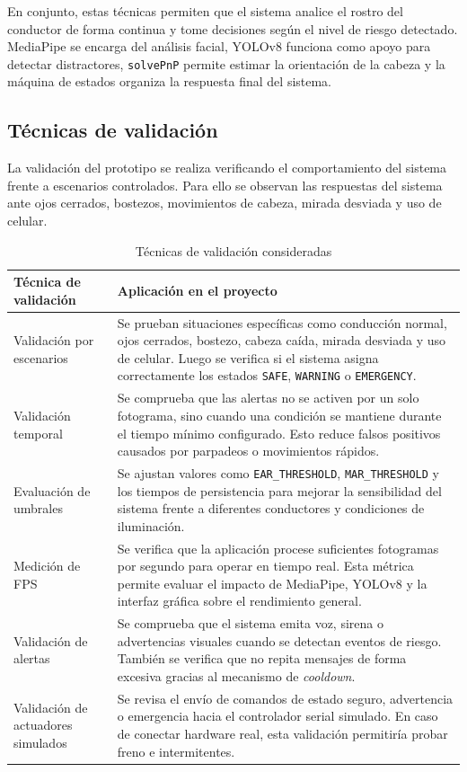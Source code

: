\documentclass[conference]{IEEEtran}
\begin{document}
En conjunto, estas técnicas permiten que el sistema analice el rostro del conductor de forma continua y tome decisiones según el nivel de riesgo detectado. MediaPipe se encarga del análisis facial, YOLOv8 funciona como apoyo para detectar distractores, \texttt{solvePnP} permite estimar la orientación de la cabeza y la máquina de estados organiza la respuesta final del sistema.



\subsection{Técnicas de validación}

La validación del prototipo se realiza verificando el comportamiento del sistema frente a escenarios controlados. Para ello se observan las respuestas del sistema ante ojos cerrados, bostezos, movimientos de cabeza, mirada desviada y uso de celular.

\begin{table}[H]
\centering
\caption{Técnicas de validación consideradas}
\label{tab:tecnicas_validacion}
\begin{tabularx}{\columnwidth}{|>{\raggedright\arraybackslash}p{2.9cm}|>{\raggedright\arraybackslash}X|}
\hline
\textbf{Técnica de validación} & \textbf{Aplicación en el proyecto} \\
\hline
Validación por escenarios & Se prueban situaciones específicas como conducción normal, ojos cerrados, bostezo, cabeza caída, mirada desviada y uso de celular. Luego se verifica si el sistema asigna correctamente los estados \texttt{SAFE}, \texttt{WARNING} o \texttt{EMERGENCY}. \\
\hline
Validación temporal & Se comprueba que las alertas no se activen por un solo fotograma, sino cuando una condición se mantiene durante el tiempo mínimo configurado. Esto reduce falsos positivos causados por parpadeos o movimientos rápidos. \\
\hline
Evaluación de umbrales & Se ajustan valores como \texttt{EAR\_THRESHOLD}, \texttt{MAR\_THRESHOLD} y los tiempos de persistencia para mejorar la sensibilidad del sistema frente a diferentes conductores y condiciones de iluminación. \\
\hline
Medición de FPS & Se verifica que la aplicación procese suficientes fotogramas por segundo para operar en tiempo real. Esta métrica permite evaluar el impacto de MediaPipe, YOLOv8 y la interfaz gráfica sobre el rendimiento general. \\
\hline
Validación de alertas & Se comprueba que el sistema emita voz, sirena o advertencias visuales cuando se detectan eventos de riesgo. También se verifica que no repita mensajes de forma excesiva gracias al mecanismo de \textit{cooldown}. \\
\hline
Validación de actuadores simulados & Se revisa el envío de comandos de estado seguro, advertencia o emergencia hacia el controlador serial simulado. En caso de conectar hardware real, esta validación permitiría probar freno e intermitentes. \\
\hline
\end{tabularx}
\end{table}
\end{document}
